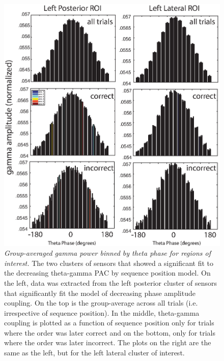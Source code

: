 \begin{figure}
  \centering
  \includegraphics[width=\textwidth]{figures/chapter3_suppfigure6.eps}
  \caption[Group-averaged gamma power binned by theta phase for regions of interest]{\textit{Group-averaged gamma power binned by theta phase for regions of interest.} The two clusters of sensors that showed a significant fit to the decreasing theta-gamma PAC by sequence position model.  On the left, data was extracted from the left posterior cluster of sensors that significantly fit the model of decreasing phase amplitude coupling.  On the top is the group-average across all trials (i.e. irrespective of sequence position).  In the middle, theta-gamma coupling is plotted as a function of sequence position only for trials where the order was later correct and on the bottom, only for trials where the order was later incorrect.  The plots on the right are the same as the left, but for the left lateral cluster of interest.}
  \label{chapter3_suppfigure6}
\end{figure}

